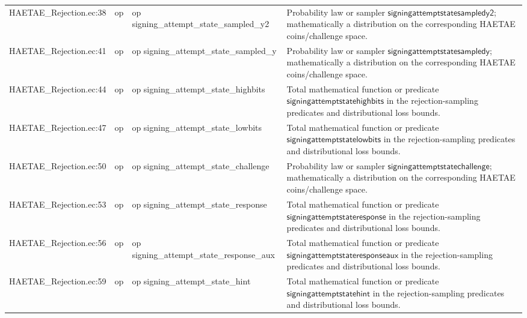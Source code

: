 \documentclass[10pt]{article}
\begin{document}
\begin{longtable}{L{0.11\textwidth}L{0.055\textwidth}L{0.385\textwidth}L{0.41\textwidth}}
HAETAE\_\allowbreak{}Rejection.\allowbreak{}ec:\allowbreak{}38 & op & {\ttfamily\scriptsize op signing\_\allowbreak{}attempt\_\allowbreak{}state\_\allowbreak{}sampled\_\allowbreak{}y2} & Probability law or sampler $\mathsf{signingattemptstatesampledy2}$; mathematically a distribution on the corresponding HAETAE coins/challenge space. \\
HAETAE\_\allowbreak{}Rejection.\allowbreak{}ec:\allowbreak{}41 & op & {\ttfamily\scriptsize op signing\_\allowbreak{}attempt\_\allowbreak{}state\_\allowbreak{}sampled\_\allowbreak{}y} & Probability law or sampler $\mathsf{signingattemptstatesampledy}$; mathematically a distribution on the corresponding HAETAE coins/challenge space. \\
HAETAE\_\allowbreak{}Rejection.\allowbreak{}ec:\allowbreak{}44 & op & {\ttfamily\scriptsize op signing\_\allowbreak{}attempt\_\allowbreak{}state\_\allowbreak{}highbits} & Total mathematical function or predicate $\mathsf{signingattemptstatehighbits}$ in the rejection-sampling predicates and distributional loss bounds. \\
HAETAE\_\allowbreak{}Rejection.\allowbreak{}ec:\allowbreak{}47 & op & {\ttfamily\scriptsize op signing\_\allowbreak{}attempt\_\allowbreak{}state\_\allowbreak{}lowbits} & Total mathematical function or predicate $\mathsf{signingattemptstatelowbits}$ in the rejection-sampling predicates and distributional loss bounds. \\
HAETAE\_\allowbreak{}Rejection.\allowbreak{}ec:\allowbreak{}50 & op & {\ttfamily\scriptsize op signing\_\allowbreak{}attempt\_\allowbreak{}state\_\allowbreak{}challenge} & Probability law or sampler $\mathsf{signingattemptstatechallenge}$; mathematically a distribution on the corresponding HAETAE coins/challenge space. \\
HAETAE\_\allowbreak{}Rejection.\allowbreak{}ec:\allowbreak{}53 & op & {\ttfamily\scriptsize op signing\_\allowbreak{}attempt\_\allowbreak{}state\_\allowbreak{}response} & Total mathematical function or predicate $\mathsf{signingattemptstateresponse}$ in the rejection-sampling predicates and distributional loss bounds. \\
HAETAE\_\allowbreak{}Rejection.\allowbreak{}ec:\allowbreak{}56 & op & {\ttfamily\scriptsize op signing\_\allowbreak{}attempt\_\allowbreak{}state\_\allowbreak{}response\_\allowbreak{}aux} & Total mathematical function or predicate $\mathsf{signingattemptstateresponseaux}$ in the rejection-sampling predicates and distributional loss bounds. \\
HAETAE\_\allowbreak{}Rejection.\allowbreak{}ec:\allowbreak{}59 & op & {\ttfamily\scriptsize op signing\_\allowbreak{}attempt\_\allowbreak{}state\_\allowbreak{}hint} & Total mathematical function or predicate $\mathsf{signingattemptstatehint}$ in the rejection-sampling predicates and distributional loss bounds. \\

\end{longtable}
\end{document}
